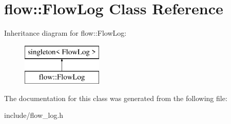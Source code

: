 \hypertarget{classflow_1_1_flow_log}{}\section{flow\+:\+:Flow\+Log Class Reference}
\label{classflow_1_1_flow_log}
Inheritance diagram for flow\+:\+:Flow\+Log\+:\begin{figure}[H]
\begin{center}
\leavevmode
\includegraphics[height=2.000000cm]{classflow_1_1_flow_log}
\end{center}
\end{figure}


The documentation for this class was generated from the following file\+:\begin{DoxyCompactItemize}
\item 
include/flow\+\_\+log.\+h\end{DoxyCompactItemize}
